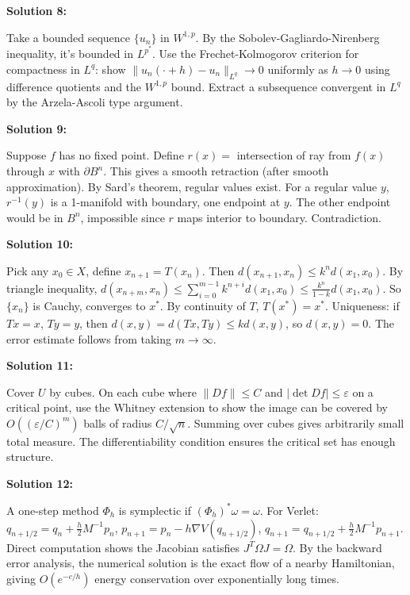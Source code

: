 \documentclass[12pt,a4paper]{exam}
\begin{document}
\vspace{0.5cm}

\textbf{Solution 8:}

Take a bounded sequence $\{u_n\}$ in $W^{1,p}$. By the Sobolev-Gagliardo-Nirenberg inequality, it's bounded in $L^{p^*}$. Use the Frechet-Kolmogorov criterion for compactness in $L^q$: show $\|u_n(\cdot + h) - u_n\|_{L^q} \to 0$ uniformly as $h \to 0$ using difference quotients and the $W^{1,p}$ bound. Extract a subsequence convergent in $L^q$ by the Arzela-Ascoli type argument.

\vspace{0.5cm}

\textbf{Solution 9:}

Suppose $f$ has no fixed point. Define $r(x) =$ intersection of ray from $f(x)$ through $x$ with $\partial B^n$. This gives a smooth retraction (after smooth approximation). By Sard's theorem, regular values exist. For a regular value $y$, $r^{-1}(y)$ is a 1-manifold with boundary, one endpoint at $y$. The other endpoint would be in $B^n$, impossible since $r$ maps interior to boundary. Contradiction.

\vspace{0.5cm}

\textbf{Solution 10:}

Pick any $x_0 \in X$, define $x_{n+1} = T(x_n)$. Then $d(x_{n+1}, x_n) \leq k^n d(x_1, x_0)$. By triangle inequality, $d(x_{n+m}, x_n) \leq \sum_{i=0}^{m-1} k^{n+i} d(x_1, x_0) \leq \frac{k^n}{1-k} d(x_1, x_0)$. So $\{x_n\}$ is Cauchy, converges to $x^*$. By continuity of $T$, $T(x^*) = x^*$. Uniqueness: if $Tx=x$, $Ty=y$, then $d(x,y) = d(Tx,Ty) \leq k d(x,y)$, so $d(x,y)=0$. The error estimate follows from taking $m \to \infty$.

\vspace{0.5cm}

\textbf{Solution 11:}

Cover $U$ by cubes. On each cube where $\|Df\| \leq C$ and $|\det Df| \leq \varepsilon$ on a critical point, use the Whitney extension to show the image can be covered by $O((\varepsilon/C)^{m})$ balls of radius $C/\sqrt{n}$. Summing over cubes gives arbitrarily small total measure. The differentiability condition ensures the critical set has enough structure.

\vspace{0.5cm}

\textbf{Solution 12:}

A one-step method $\Phi_h$ is symplectic if $(\Phi_h)^*\omega = \omega$. For Verlet: $q_{n+1/2} = q_n + \frac{h}{2} M^{-1} p_n$, $p_{n+1} = p_n - h \nabla V(q_{n+1/2})$, $q_{n+1} = q_{n+1/2} + \frac{h}{2} M^{-1} p_{n+1}$. Direct computation shows the Jacobian satisfies $J^T \Omega J = \Omega$. By the backward error analysis, the numerical solution is the exact flow of a nearby Hamiltonian, giving $O(e^{-c/h})$ energy conservation over exponentially long times.
\end{document}
